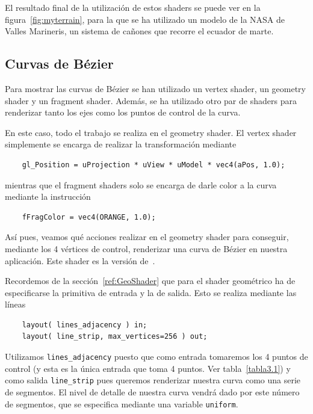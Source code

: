 El resultado final de la utilización de estos shaders se puede ver en la
figura~\ref{fig:myterrain}, para la que se ha utilizado un modelo de la NASA de
Valles Marineris, un sistema de cañones que recorre el ecuador de marte.

\subsection{Curvas de Bézier}
\label{makereference5.5.2}

Para mostrar las curvas de Bézier se han utilizado un vertex shader, un geometry
shader y un fragment shader. Además, se ha utilizado otro par de shaders para
renderizar tanto los ejes como los puntos de control de la curva. 

En este caso, todo el trabajo se realiza en el geometry shader. El vertex shader
simplemente se encarga de realizar la transformación mediante

\begin{verbatim}
    gl_Position = uProjection * uView * uModel * vec4(aPos, 1.0);
\end{verbatim}
mientras que el fragment shaders solo se encarga de darle color a la curva
mediante la instrucción

\begin{verbatim}
    fFragColor = vec4(ORANGE, 1.0);
\end{verbatim}

Así pues, veamos qué acciones realizar en el geometry shader para conseguir,
mediante los 4 vértices de control, renderizar una curva de Bézier en nuestra
aplicación. Este shader es la versión de~\citet{Bailey}. 

Recordemos de la sección~\ref{ref:GeoShader} que para el shader geométrico ha de
especificarse la primitiva de entrada y la de salida. Esto se realiza mediante
las líneas

\begin{verbatim}
    layout( lines_adjacency ) in;
    layout( line_strip, max_vertices=256 ) out;
\end{verbatim}

Utilizamos \verb|lines_adjacency| puesto que como entrada tomaremos los 4 puntos
de control (y esta es la única entrada que toma 4 puntos. Ver
tabla~\ref{tabla3.1}) y como salida \verb|line_strip| pues queremos renderizar
nuestra curva como una serie de segmentos. El nivel de detalle de nuestra curva
vendrá dado por este número de segmentos, que se especifica mediante una
variable \verb|uniform|.

